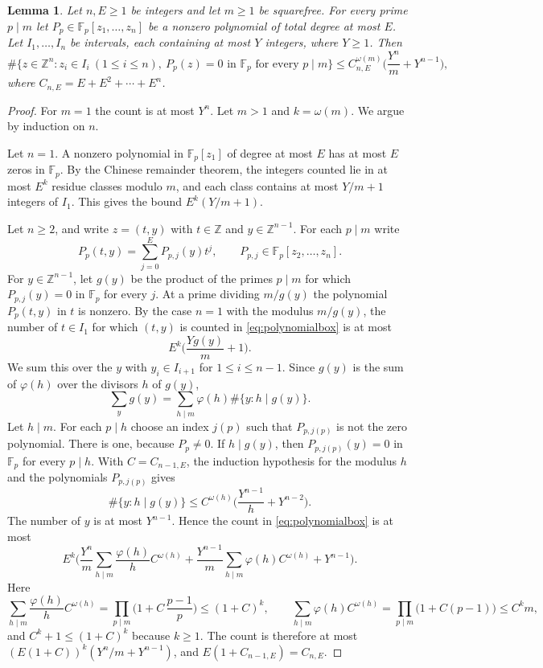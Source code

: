 \documentclass[11pt]{amsart}
\numberwithin{equation}{section}
\numberwithin{figure}{section}
\newtheorem{lemma}{Lemma}[section]
\theoremstyle{definition}
\newcommand{\Z}{\mathbb{Z}}
\newcommand{\Fp}{\mathbb F_p}
\begin{document}
\begin{lemma}\label{lem:polynomialbox}
Let $n,E\ge1$ be integers and let $m\ge1$ be squarefree. For every
prime $p\mid m$ let $P_p\in\Fp[z_1,\ldots,z_n]$ be a nonzero
polynomial of total degree at most $E$. Let $I_1,\ldots,I_n$ be
intervals, each containing at most $Y$ integers, where $Y\ge1$. Then
\begin{equation}\label{eq:polynomialbox}
 \#\{z\in\Z^n:z_i\in I_i\ (1\le i\le n),\ P_p(z)=0\text{ in }\Fp
 \text{ for every }p\mid m\}
 \le C_{n,E}^{\omega(m)}\Big(\frac{Y^n}m+Y^{n-1}\Big),
\end{equation}
where $C_{n,E}=E+E^2+\cdots+E^n$.
\end{lemma}

\begin{proof}
For $m=1$ the count is at most $Y^n$. Let $m>1$ and $k=\omega(m)$. We
argue by induction on $n$.

Let $n=1$. A nonzero polynomial in $\Fp[z_1]$ of degree at most $E$
has at most $E$ zeros in $\Fp$. By the Chinese remainder theorem, the
integers counted lie in at most $E^k$ residue classes modulo $m$, and
each class contains at most $Y/m+1$ integers of $I_1$. This gives the
bound $E^k(Y/m+1)$.

Let $n\ge2$, and write $z=(t,y)$ with $t\in\Z$ and $y\in\Z^{n-1}$.
For each $p\mid m$ write
\[
 P_p(t,y)=\sum_{j=0}^EP_{p,j}(y)t^j,\qquad P_{p,j}\in\Fp[z_2,\ldots,z_n].
\]
For $y\in\Z^{n-1}$, let $g(y)$ be the product of the primes $p\mid m$
for which $P_{p,j}(y)=0$ in $\Fp$ for every $j$. At a prime dividing
$m/g(y)$ the polynomial $P_p(t,y)$ in $t$ is nonzero. By the case
$n=1$ with the modulus $m/g(y)$, the number of $t\in I_1$ for which
$(t,y)$ is counted in \eqref{eq:polynomialbox} is at most
\[
 E^k\Big(\frac{Yg(y)}m+1\Big).
\]
We sum this over the $y$ with $y_i\in I_{i+1}$ for $1\le i\le n-1$.
Since $g(y)$ is the sum of $\varphi(h)$ over the divisors $h$ of
$g(y)$,
\[
 \sum_yg(y)=\sum_{h\mid m}\varphi(h)\#\{y:h\mid g(y)\}.
\]
Let $h\mid m$. For each $p\mid h$ choose an index $j(p)$ such that
$P_{p,j(p)}$ is not the zero polynomial. There is one, because
$P_p\ne0$. If $h\mid g(y)$, then $P_{p,j(p)}(y)=0$ in $\Fp$ for
every $p\mid h$. With $C=C_{n-1,E}$, the induction hypothesis for the
modulus $h$ and the polynomials $P_{p,j(p)}$ gives
\[
 \#\{y:h\mid g(y)\}\le C^{\omega(h)}\Big(\frac{Y^{n-1}}h+Y^{n-2}\Big).
\]
The number of $y$ is at most $Y^{n-1}$. Hence the count in
\eqref{eq:polynomialbox} is at most
\[
 E^k\bigg(\frac{Y^n}m\sum_{h\mid m}\frac{\varphi(h)}hC^{\omega(h)}
 +\frac{Y^{n-1}}m\sum_{h\mid m}\varphi(h)C^{\omega(h)}+Y^{n-1}\bigg).
\]
Here
\[
 \sum_{h\mid m}\frac{\varphi(h)}hC^{\omega(h)}
 =\prod_{p\mid m}\Big(1+C\,\frac{p-1}p\Big)\le(1+C)^k,
 \qquad
 \sum_{h\mid m}\varphi(h)C^{\omega(h)}
 =\prod_{p\mid m}\big(1+C(p-1)\big)\le C^km,
\]
and $C^k+1\le(1+C)^k$ because $k\ge1$. The count is therefore at
most $(E(1+C))^k(Y^n/m+Y^{n-1})$, and $E(1+C_{n-1,E})=C_{n,E}$.
\end{proof}
\end{document}
